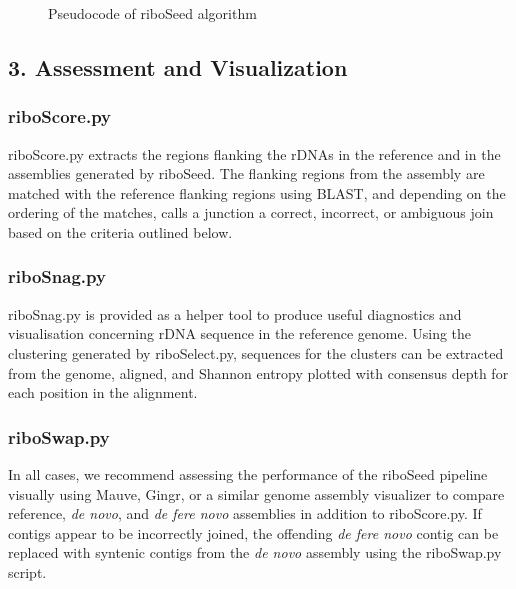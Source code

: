 \documentclass[10pt]{article}
\begin{document}
\begin{linenumbers}
\begin{figure}[h]
\begin{minipage}{.6\linewidth}
\begin{algorithm}[H]
    \end{algorithm}
  \end{minipage}
  \caption{Pseudocode of riboSeed algorithm}
  \label{fig:algo}
\end{figure}


\subsection*{3. Assessment and Visualization}
\subsubsection*{riboScore.py}
riboScore.py extracts the regions flanking the rDNAs in the reference and in the assemblies generated by riboSeed. The flanking regions from the assembly are matched with the reference flanking regions using BLAST, and depending on the ordering of the matches, calls a junction a correct, incorrect, or ambiguous join based on the criteria outlined below.
\subsubsection*{riboSnag.py}
riboSnag.py is provided as a helper tool to produce useful diagnostics and visualisation concerning rDNA sequence in the reference genome. Using the clustering generated by riboSelect.py, sequences for the clusters can be extracted from the genome, aligned, and Shannon entropy \cite{Schmitt1997} plotted with consensus depth for each position in the alignment.
\subsubsection*{riboSwap.py}
In all cases, we recommend assessing the performance of the riboSeed pipeline visually using Mauve\cite{Darling2004,Darling2011}, Gingr\cite{Treangen2014}, or a similar genome assembly visualizer to compare reference, \textit{de novo}, and \textit{de fere novo} assemblies in addition to riboScore.py. If contigs appear to be incorrectly joined, the offending \textit{de fere novo} contig can be replaced with syntenic contigs from the \textit{de novo} assembly using the riboSwap.py script.



\end{linenumbers}
\end{document}
